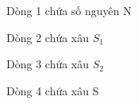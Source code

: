 Dòng 1 chứa số nguyên N  

   Dòng 2 chứa xâu $S_{1}$

   Dòng 3 chứa xâu $S_{2}$

   Dòng 4 chứa xâu S